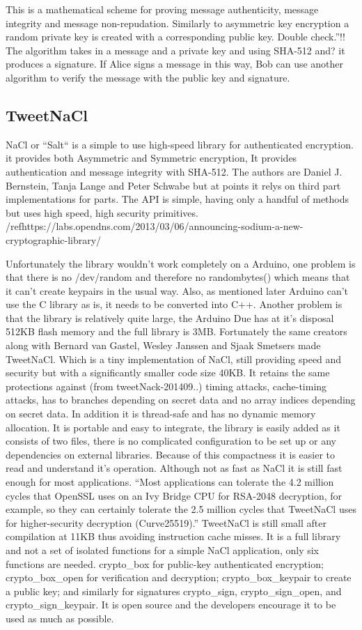 This is a mathematical scheme for proving message authenticity, message integrity and message non-repudation. Similarly to asymmetric key encryption a random private key is created with a corresponding public key. Double check.''!! The algorithm takes in a message and a private key and using SHA-512 and? it produces a signature. If Alice signs a message in this way, Bob can use another algorithm to verify the message with the public key and signature.

\subsection{TweetNaCl}

NaCl or ``Salt`` is a simple to use high-speed library for authenticated encryption. it provides both Asymmetric and Symmetric encryption, It provides authentication and message integrity with SHA-512. The authors are Daniel J. Bernstein, Tanja Lange and Peter Schwabe but at points it relys on third part implementations for parts. The API is simple, having only a handful of methods but uses high speed, high security primitives.
/ref{https://labs.opendns.com/2013/03/06/announcing-sodium-a-new-cryptographic-library/}

Unfortunately the library wouldn't work completely on a Arduino, one problem is that there is no /dev/random and therefore no randombytes() which means that it can't create keypairs in the usual way.
Also, as mentioned later Arduino can't use the C library as is, it needs to be converted into C++. 
Another problem is that the library is relatively quite large, the Arduino Due has at it's disposal 512KB flash memory and the full library is 3MB. Fortunately the same creators along with Bernard van Gastel, Wesley Janssen and Sjaak Smetsers made TweetNaCl. Which is a tiny implementation of NaCl, still providing speed and security but with a significantly smaller code size 40KB. It retains the same protections against (from tweetNack-201409..) timing attacks, cache-timing attacks, has to branches depending on secret data and no array indices depending on secret data. In addition it is thread-safe and has no dynamic memory allocation. It is portable and easy to integrate, the library is easily added as it consists of two files, there is no complicated configuration to be set up or any dependencies on external libraries. Because of this compactness it is easier to read and understand it's operation. Although not as fast as NaCl it is still fast enough for most applications. ``Most applications can tolerate the 4.2 million cycles that OpenSSL uses
on an Ivy Bridge CPU for RSA-2048 decryption, for example, so they can certainly tolerate
the 2.5 million cycles that TweetNaCl uses for higher-security decryption (Curve25519).''
TweetNaCl is still small after compilation at 11KB thus avoiding instruction cache misses. It is a full library and not a set of isolated functions for a simple NaCl application, only six functions are needed. crypto\_box for public-key authenticated encryption; crypto\_box\_open for verification and decryption; crypto\_box\_keypair to create a public key; and similarly for signatures crypto\_sign, crypto\_sign\_open, and crypto\_sign\_keypair. It is open source and the developers encourage it to be used as much as possible. 

